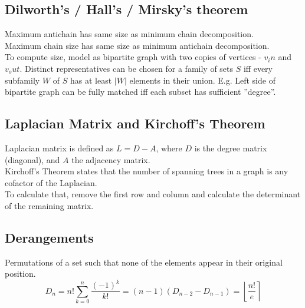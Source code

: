     \subsection{Dilworth's / Hall's / Mirsky's theorem}
    Maximum antichain has same size as minimum chain decomposition.\\
    Maximum chain size has same size as minimum antichain decomposition.\\
    To compute size, model as bipartite graph with two copies of vertices - $v_in$ and $v_out$.
    Distinct representatives can be chosen for a family of sets $S$ iff every subfamily $W$ of $S$ has at least $|W|$
    elements in their union. E.g. Left side of bipartite graph can be fully matched iff each subset has sufficient ”degree”.

    \subsection{Laplacian Matrix and Kirchoff’s Theorem}

    Laplacian matrix is defined as $L = D - A$, where $D$ is the degree matrix (diagonal), and $A$ the adjacency matrix.\\
    Kirchoff’s Theorem states that the number of spanning trees in a graph is any cofactor of the Laplacian.\\
    To calculate that, remove the first row and column and calculate the determinant of the remaining matrix.

    \subsection{Derangements}
		Permutations of a set such that none of the elements appear in their original position.
    $$D_n = n!\sum_{k=0}^n \frac{(-1)^k}{k!} = (n-1)(D_{n-2}-D_{n-1}) = \left\lfloor\frac{n!}{e}\right\rceil$$




